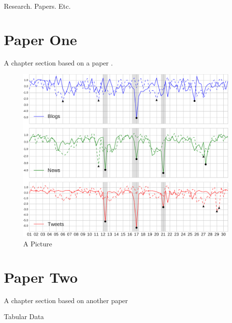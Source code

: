 Research. Papers. Etc.

\section{Paper One}
\label{paper:one}

A chapter section based on a paper \cite{morley2014academic}.

\begin{figure}
\includegraphics[width=\textwidth]{figures/trump.pdf}
\caption{A Picture}
\label{fig:picture}
\end{figure}

\section{Paper Two}
\label{paper:two}

A chapter section based on another paper

\begin{table}
\caption{Tabular Data}
\label{tbl:table}
\end{table}